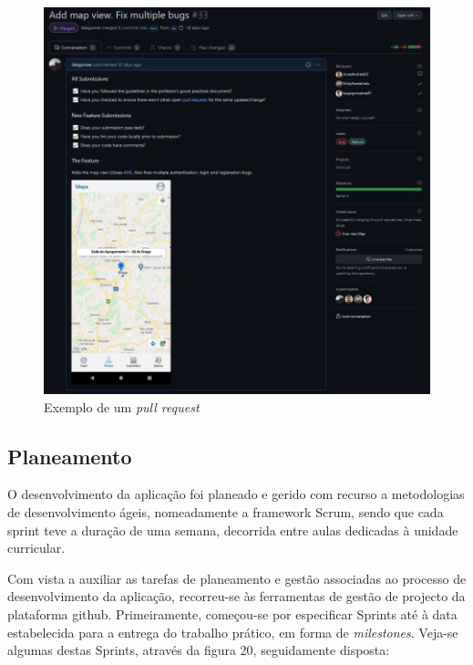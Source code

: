 \documentclass[12pt]{report}
\begin{document}
\bigskip
\begin{figure}[H]
    \centering
    \includegraphics[width=1\textwidth]{pull-request.png}
    \caption{Exemplo de um \textit{pull request}}
\end{figure}

\subsection{Planeamento}

O desenvolvimento da aplicação foi planeado e gerido com recurso a metodologias de desenvolvimento ágeis, nomeadamente a \gls{framework} Scrum, sendo que cada \gls{sprint} teve a duração de uma semana, decorrida entre aulas dedicadas à unidade curricular.

Com vista a auxiliar as tarefas de planeamento e gestão associadas ao processo de desenvolvimento da aplicação, recorreu-se às ferramentas de gestão de projecto da plataforma \gls{github}. Primeiramente, começou-se por especificar Sprints até à data estabelecida para a entrega do trabalho prático, em forma de \textit{milestones}. Veja-se algumas destas Sprints, através da figura 20, seguidamente disposta:
\end{document}
